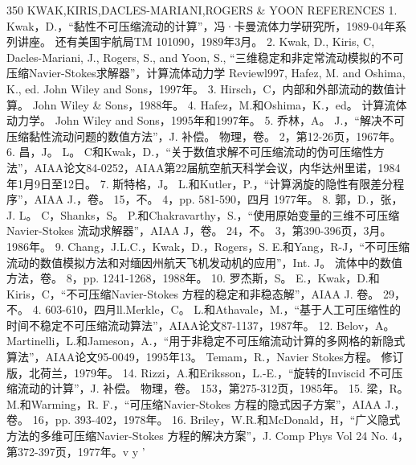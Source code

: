 \documentclass[UTF8,11pt,a4paper,openany,fontset=fandol]{ctexbook}
\begin{document}
350 KWAK,KIRIS,DACLES-MARIANI,ROGERS \& YOON REFERENCES 1. Kwak，D.，“黏性不可压缩流动的计算”，冯·卡曼流体力学研究所，1989-04年系列讲座。 还有美国宇航局TM 101090，1989年3月。 2. Kwak, D., Kiris, C, Dacles-Mariani, J., Rogers, S., and Yoon, S., “三维稳定和非定常流动模拟的不可压缩Navier-Stokes求解器”，计算流体动力学 Reviewl997, Hafez, M. and Oshima, K., ed. John Wiley and Sons，1997年。 3. Hirsch，C，内部和外部流动的数值计算。 John Wiley \& Sons，1988年。 4. Hafez，M.和Oshima，K.，ed。 计算流体动力学。 John Wiley and Sons，1995年和1997年。 5. 乔林，A。 J.，“解决不可压缩黏性流动问题的数值方法”，J. 补偿。 物理，卷。 2，第12-26页，1967年。 6. 昌，J。 L。 C和Kwak，D.，“关于数值求解不可压缩流动的伪可压缩性方法”，AIAA论文84-0252，AIAA第22届航空航天科学会议，内华达州里诺，1984年1月9日至12日。 7. 斯特格，J。 L.和Kutler，P.，“计算涡旋的隐性有限差分程序”，AIAA J.，卷。 15，不。 4，pp. 581-590，四月 1977年。 8. 郭，D.，张，J. L。 C，Shanks，S。 P.和Chakravarthy，S.，“使用原始变量的三维不可压缩Navier-Stokes 流动求解器”，AIAA J，卷。 24，不。 3，第390-396页，3月。 1986年。 9. Chang，J.L.C.，Kwak，D.，Rogers，S. E.和Yang，R-J，“不可压缩流动的数值模拟方法和对缅因州航天飞机发动机的应用”，Int. J。 流体中的数值方法，卷。 8，pp. 1241-1268，1988年。 10. 罗杰斯，S。 E.，Kwak，D.和Kiris，C，“不可压缩Navier-Stokes 方程的稳定和非稳态解”，AIAA J. 卷。 29，不。 4. 603-610，四月ll.Merkle，C。 L.和Athavale，M.，“基于人工可压缩性的时间不稳定不可压缩流动算法”，AIAA论文87-1137，1987年。 12. Belov，A。 Martinelli，L.和Jameson，A.，“用于非稳定不可压缩流动计算的多网格的新隐式算法”，AIAA论文95-0049，1995年13。 Temam，R.，Navier Stokes方程。 修订版，北荷兰，1979年。 14. Rizzi，A.和Eriksson，L.-E.，“旋转的Inviscid 不可压缩流动的计算”，J. 补偿。 物理，卷。 153，第275-312页，1985年。 15. 梁，R。 M.和Warming，R. F.，“可压缩Navier-Stokes 方程的隐式因子方案”，AIAA J.，卷。 16，pp. 393-402，1978年。 16. Briley，W.R.和McDonald，H，“广义隐式方法的多维可压缩Navier-Stokes 方程的解决方案”，J. Comp Phys Vol 24 No. 4，第372-397页，1977年。v y '
\end{document}
